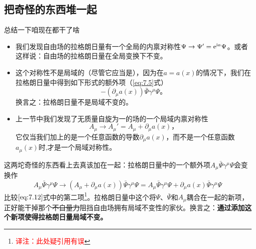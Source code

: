 \subsection{把奇怪的东西堆一起}\label{sec7.1.3}
总结一下咱现在都干了啥
\begin{itemize}
\item 我们发现\spint 自由场的拉格朗日量有一个全局的内禀对称性$\Psi\rightarrow\Psi' = \mathrm e^{\mathrm i a}\Psi$。或者这样说：\spint 自由场的拉格朗日量在全局\uo 变换下不变。
\item 这个对称性不是局域的（尽管它应当是），因为在$a=a(x)$的情况下，我们在拉格朗日量中得到如下形式的额外项（\ref{eq:7.5}式）
\begin{equation}
-(\partial_\mu a(x))\bar\Psi\gamma^\mu\Psi \text{。}
\label{eq:7.12}
\end{equation}
换言之：拉格朗日量不是局域\uo 不变的。
\item 上一节中我们发现了无质量自旋为一的场的一个局域内禀对称性
\begin{equation}
A_\mu \rightarrow A_\mu' = A_\mu +\partial_\mu a(x) \text{，}
\end{equation}
它仅当我们加上的是一个任意函数的导数$\partial_\mu a(x)$，而不是一个任意函数$a_\mu(x)$时,才是一个局域对称性。
\end{itemize}
这两坨奇怪的东西看上去真该加在一起：拉格朗日量中的一个额外项$A_\mu\bar\Psi\gamma^\mu\Psi$会变换作
\begin{equation}
A_\mu\bar\Psi\gamma^\mu\Psi \rightarrow (A_\mu+\partial_\mu a(x))\bar\Psi\gamma^\mu\Psi = A_\mu\bar\Psi\gamma^\mu\Psi + \partial_\mu a(x)\bar\Psi\gamma^\mu\Psi
\end{equation}
比较$\ref{eq:7.12}$式中的第二项\footnote{\textcolor{red}{译注：此处疑引用有误}}。拉格朗日量中这个将$\Psi$、$\bar\Psi$和$A_\mu$耦合在一起的新项，正好能干掉那个\sout{不自量力}阻挡\spint 自由场拥有局域\uo 不变性的家伙。换言之：{\bf 通过添加这个新项使得拉格朗日量局域\uo 不变。}

